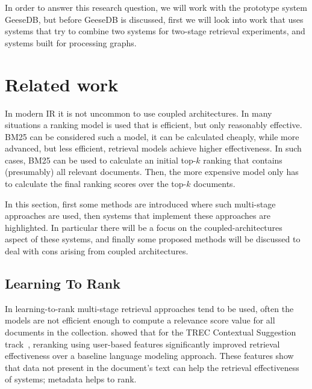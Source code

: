 In order to answer this research question, we will work with the prototype system GeeseDB, but before GeeseDB is discussed, first we will look into work that uses systems that try to combine two systems for two-stage retrieval experiments, and systems built for processing graphs.


\section{Related work }
In modern IR it is not uncommon to use coupled architectures. In many situations a ranking model is used that is efficient, but only reasonably effective. BM25 can be considered such a model, it can be calculated cheaply, while more advanced, but less efficient, retrieval models achieve higher effectiveness. In such cases, BM25 can be used to calculate an initial top-$k$ ranking that contains (presumably) all relevant documents. Then, the more expensive model only has to calculate the final ranking scores over the top-$k$ documents.

In this section, first some methods are introduced where such multi-stage approaches are used, then systems that implement these approaches are highlighted. In particular there will be a focus on the coupled-architectures aspect of these systems, and finally some proposed methods will be discussed to deal with cons arising from coupled architectures. 

\subsection{Learning To Rank}
In learning-to-rank multi-stage retrieval approaches tend to be used, often the models are not efficient enough to compute a relevance score value for all documents in the collection.  showed that for the TREC Contextual Suggestion track~\citep{contextual-suggestion-track}, reranking using user-based features significantly improved retrieval effectiveness over a baseline language modeling approach. These features show that data not present in the document's text can help the retrieval effectiveness of systems; metadata helps to rank. 

